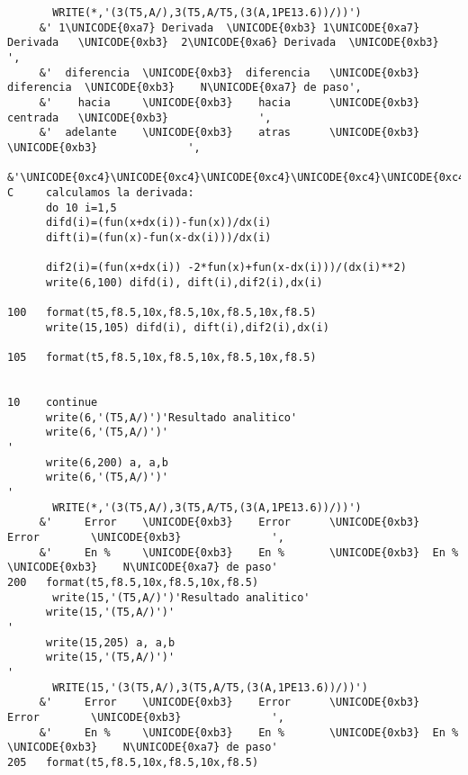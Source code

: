 \documentclass{article}
\begin{document}
\begin{verbatim}
       WRITE(*,'(3(T5,A/),3(T5,A/T5,(3(A,1PE13.6))/))')
     &' 1\UNICODE{0xa7} Derivada  \UNICODE{0xb3} 1\UNICODE{0xa7} Derivada   \UNICODE{0xb3}  2\UNICODE{0xa6} Derivada  \UNICODE{0xb3}              ',
     &'  diferencia  \UNICODE{0xb3}  diferencia   \UNICODE{0xb3}   diferencia  \UNICODE{0xb3}    N\UNICODE{0xa7} de paso',
     &'    hacia     \UNICODE{0xb3}    hacia      \UNICODE{0xb3}    centrada   \UNICODE{0xb3}              ',
     &'  adelante    \UNICODE{0xb3}    atras      \UNICODE{0xb3}               \UNICODE{0xb3}              ',
     &'\UNICODE{0xc4}\UNICODE{0xc4}\UNICODE{0xc4}\UNICODE{0xc4}\UNICODE{0xc4}\UNICODE{0xc4}\UNICODE{0xc4}\UNICODE{0xc4}\UNICODE{0xc4}\UNICODE{0xc4}\UNICODE{0xc4}\UNICODE{0xc4}\UNICODE{0xc4}\UNICODE{0xc4}\UNICODE{0xc5}\UNICODE{0xc4}\UNICODE{0xc4}\UNICODE{0xc4}\UNICODE{0xc4}\UNICODE{0xc4}\UNICODE{0xc4}\UNICODE{0xc4}\UNICODE{0xc4}\UNICODE{0xc4}\UNICODE{0xc4}\UNICODE{0xc4}\UNICODE{0xc4}\UNICODE{0xc4}\UNICODE{0xc4}\UNICODE{0xc4}\UNICODE{0xc5}\UNICODE{0xc4}\UNICODE{0xc4}\UNICODE{0xc4}\UNICODE{0xc4}\UNICODE{0xc4}\UNICODE{0xc4}\UNICODE{0xc4}\UNICODE{0xc4}\UNICODE{0xc4}\UNICODE{0xc4}\UNICODE{0xc4}\UNICODE{0xc4}\UNICODE{0xc4}\UNICODE{0xc4}\UNICODE{0xc4}\UNICODE{0xc5}\UNICODE{0xc4}\UNICODE{0xc4}\UNICODE{0xc4}\UNICODE{0xc4}\UNICODE{0xc4}\UNICODE{0xc4}\UNICODE{0xc4}\UNICODE{0xc4}\UNICODE{0xc4}\UNICODE{0xc4}\UNICODE{0xc4}\UNICODE{0xc4}\UNICODE{0xc4}\UNICODE{0xc4}'
C     calculamos la derivada:
      do 10 i=1,5
      difd(i)=(fun(x+dx(i))-fun(x))/dx(i)
      dift(i)=(fun(x)-fun(x-dx(i)))/dx(i)
 
      dif2(i)=(fun(x+dx(i)) -2*fun(x)+fun(x-dx(i)))/(dx(i)**2)
      write(6,100) difd(i), dift(i),dif2(i),dx(i)
 
100   format(t5,f8.5,10x,f8.5,10x,f8.5,10x,f8.5)
      write(15,105) difd(i), dift(i),dif2(i),dx(i)
 
105   format(t5,f8.5,10x,f8.5,10x,f8.5,10x,f8.5)
 
 
10    continue
      write(6,'(T5,A/)')'Resultado analitico'
      write(6,'(T5,A/)')'                                              '
      write(6,200) a, a,b
      write(6,'(T5,A/)')'                                              '
       WRITE(*,'(3(T5,A/),3(T5,A/T5,(3(A,1PE13.6))/))')
     &'     Error    \UNICODE{0xb3}    Error      \UNICODE{0xb3}  Error        \UNICODE{0xb3}              ',
     &'     En %     \UNICODE{0xb3}    En %       \UNICODE{0xb3}  En %         \UNICODE{0xb3}    N\UNICODE{0xa7} de paso'
200   format(t5,f8.5,10x,f8.5,10x,f8.5)
       write(15,'(T5,A/)')'Resultado analitico'
      write(15,'(T5,A/)')'                                             '
      write(15,205) a, a,b
      write(15,'(T5,A/)')'                                             '
       WRITE(15,'(3(T5,A/),3(T5,A/T5,(3(A,1PE13.6))/))')
     &'     Error    \UNICODE{0xb3}    Error      \UNICODE{0xb3}  Error        \UNICODE{0xb3}              ',
     &'     En %     \UNICODE{0xb3}    En %       \UNICODE{0xb3}  En %         \UNICODE{0xb3}    N\UNICODE{0xa7} de paso'
205   format(t5,f8.5,10x,f8.5,10x,f8.5)
 

\end{verbatim}
\end{document}

